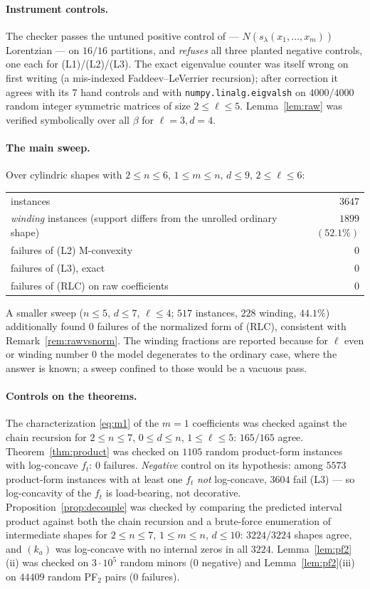 \documentclass[11pt]{article}
\theoremstyle{definition}
\begin{document}
\paragraph{Instrument controls.} The checker passes the untuned positive control of
\cite[Thm.~3]{HMMS} --- $N(s_\lambda(x_1,\dots,x_m))$ Lorentzian --- on $16/16$ partitions, and
\emph{refuses} all three planted negative controls, one each for (L1)/(L2)/(L3). The exact
eigenvalue counter was itself wrong on first writing (a mis-indexed Faddeev--LeVerrier
recursion); after correction it agrees with its $7$ hand controls and with
\verb|numpy.linalg.eigvalsh| on $4000/4000$ random integer symmetric matrices of size
$2\le\ell\le5$. Lemma~\ref{lem:raw} was verified symbolically over all $\beta$ for
$\ell=3,d=4$.

\paragraph{The main sweep.} Over cylindric shapes with $2\le n\le6$, $1\le m\le n$,
$d\le9$, $2\le\ell\le6$:
\begin{center}
\begin{tabular}{lr}
instances & $3647$\\
\emph{winding} instances (support differs from the unrolled ordinary shape) & $1899$ $(52.1\%)$\\
failures of (L2) M-convexity & $0$\\
failures of (L3), exact & $0$\\
failures of (RLC) on raw coefficients & $0$\\
\end{tabular}
\end{center}
A smaller sweep ($n\le5$, $d\le7$, $\ell\le4$; $517$ instances, $228$ winding, $44.1\%$)
additionally found $0$ failures of the normalized form of (RLC), consistent with
Remark~\ref{rem:rawvsnorm}. The winding fractions are reported because for
$\ell$ even or winding number $0$ the model degenerates to the ordinary case, where the answer
is known; a sweep confined to those would be a vacuous pass.

\paragraph{Controls on the theorems.} The characterization \eqref{eq:m1} of the $m=1$
coefficients was checked against the chain recursion for $2\le n\le7$, $0\le d\le n$,
$1\le\ell\le5$: $165/165$ agree. Theorem~\ref{thm:product} was checked on $1105$ random
product-form instances with log-concave $f_t$: $0$ failures. \emph{Negative} control on its
hypothesis: among $5573$ product-form instances with at least one $f_t$ \emph{not} log-concave,
$3604$ fail (L3) --- so log-concavity of the $f_t$ is load-bearing, not decorative.
Proposition~\ref{prop:decouple} was checked by comparing the predicted interval product against
both the chain recursion and a brute-force enumeration of intermediate shapes for
$2\le n\le7$, $1\le m\le n$, $d\le10$: $3224/3224$ shapes agree, and $(k_a)$ was log-concave
with no internal zeros in all $3224$. Lemma~\ref{lem:pf2}(ii) was checked on $3\cdot10^5$
random minors ($0$ negative) and Lemma~\ref{lem:pf2}(iii) on $44409$ random PF$_2$ pairs
($0$ failures).
\end{document}
